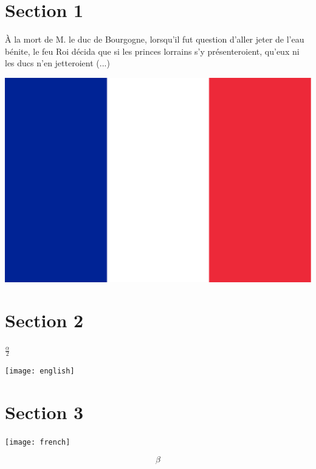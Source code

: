 \documentclass{article}
\begin{document}
\section{Section 1}

\`A la mort de M. le duc de Bourgogne, lorsqu'il fut question d'aller jeter de l'eau b\'enite, le feu Roi d\'ecida que si les princes lorrains s'y pr\'esenteroient, qu'eux ni les ducs n'en jetteroient (...)

\cite{Ref1}

\includegraphics{test12img}

\section{Section 2}

$\frac{\alpha}{2}$

\texttt{[image: english]}

\section{Section 3}

\texttt{[image: french]}

\[
	\beta
\]



\end{document}

